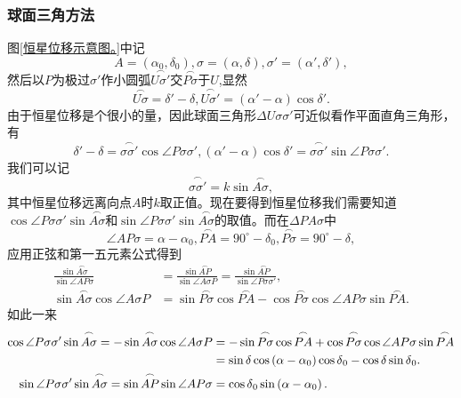\documentclass[11pt, a4paper, oneside]{ctexart}
\numberwithin{equation}{subsection}
\begin{document}
\subsubsection{球面三角方法}
图\ref{恒星位移示意图。}中记
\begin{equation}
A=\left(\alpha_0,\delta_0\right),\sigma=\left(\alpha,\delta\right),\sigma'=\left(\alpha',\delta'\right),
\end{equation}
然后以$P$为极过$\sigma'$作小圆弧$\overset{\frown}{U\sigma'}$交$\overset{\frown}{P\sigma}$于$U$,显然
\begin{equation}
\overset{\frown}{U\sigma}=\delta{}'-\delta{},\overset{\frown}{U\sigma'}=\left(\alpha'-\alpha\right)\cos\delta{}'.
\end{equation}
由于恒星位移是个很小的量，因此球面三角形$\Delta{}U\sigma\sigma'$可近似看作平面直角三角形，有
\begin{equation}
\delta'-\delta=\overset{\frown}{\sigma\sigma'}\cos\angle{P\sigma\sigma'},\left(\alpha'-\alpha\right)\cos\delta'=\overset{\frown}{\sigma\sigma'}\sin\angle{P\sigma\sigma'}.
\end{equation}
我们可以记
\begin{equation}
\overset{\frown}{\sigma\sigma'}=k\sin\overset{\frown}{A\sigma},
\end{equation}
其中恒星位移远离向点$A$时$k$取正值。现在要得到恒星位移我们需要知道$\cos\angle{P\sigma\sigma'}\sin\overset{\frown}{A\sigma}$和$\sin\angle{P\sigma\sigma'}\sin\overset{\frown}{A\sigma}$的取值。而在$\Delta{}PA\sigma$中
\begin{equation}
\angle{AP\sigma}=\alpha-\alpha_{0},\overset{\frown}{PA}=90^{\circ}-\delta{}_{0},\overset{\frown}{P\sigma}=90^{\circ}-\delta{},
\end{equation}
应用正弦和第一五元素公式得到
\begin{align}
\frac{\sin\overset{\frown}{A\sigma}}{\sin\angle{AP\sigma}}&=\frac{\sin\overset{\frown}{AP}}{\sin\angle{A\sigma P}}=\frac{\sin\overset{\frown}{AP}}{\sin\angle{P\sigma\sigma'}},\\
\sin\overset{\frown}{A\sigma}\cos\angle{A\sigma P}&=\sin\overset{\frown}{P\sigma}\cos\overset{\frown}{PA}-\cos\overset{\frown}{P\sigma}\cos\angle{AP\sigma}\sin\overset{\frown}{PA}.
\end{align}
如此一来
\begin{align}
\cos\angle{P\sigma\sigma'}\sin\overset{\frown}{A\sigma}=-\sin\overset{\frown}{A\sigma}\cos\angle{A\sigma P}&=-\sin\overset{\frown}{P\sigma}\cos\overset{\frown}{PA}+\cos\overset{\frown}{P\sigma}\cos\angle{AP\sigma}\sin\overset{\frown}{PA}\notag\\
&=\sin\delta{}\cos\left(\alpha-\alpha_{0}\right)\cos\delta{}_{0}-\cos\delta{}\sin\delta{}_{0}.\\
\sin\angle{P\sigma\sigma'}\sin\overset{\frown}{A\sigma}=\sin\overset{\frown}{AP}\sin\angle{AP\sigma}&=\cos\delta{}_{0}\sin\left(\alpha-\alpha_{0}\right).
\end{align}
\end{document}
